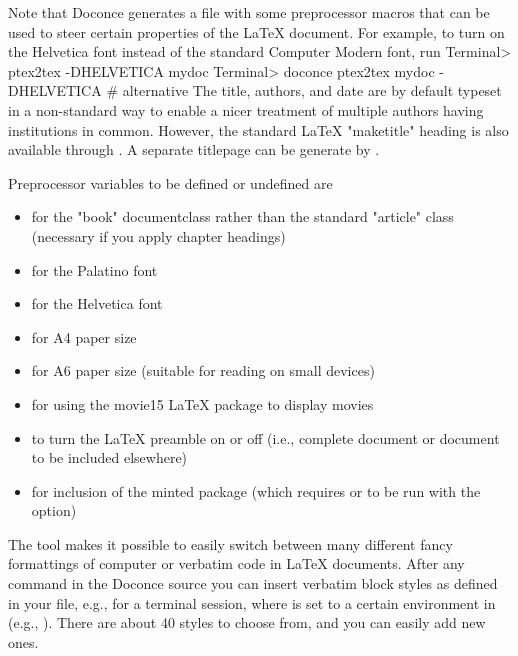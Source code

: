 \documentclass[%
oneside,                 %
final,                   %
chapterprefix=true,      %
open=right               %
10pt]{book}
\begin{document}
{{Note that Doconce generates a  file with some preprocessor macros
that can be used to steer certain properties of the {\LaTeX} document.
For example, to turn on the Helvetica font instead of the standard
Computer Modern font, run
\bsys
Terminal> ptex2tex -DHELVETICA mydoc
Terminal> doconce ptex2tex mydoc -DHELVETICA  # alternative
\esys
The title, authors, and date are by default typeset in a non-standard
way to enable a nicer treatment of multiple authors having
institutions in common. However, the standard {\LaTeX} "maketitle" heading
is also available through .
A separate titlepage can be generate by
.

Preprocessor variables to be defined or undefined are

\begin{itemize}
 \item {} for the "book" documentclass rather than the standard
   "article" class (necessary if you apply chapter headings)

 \item {} for the Palatino font

 \item {} for the Helvetica font

 \item {} for A4 paper size

 \item {} for A6 paper size (suitable for reading on small devices)

 \item {} for using the movie15 {\LaTeX} package to display movies

 \item {} to turn the {\LaTeX} preamble on or off (i.e., complete document
   or document to be included elsewhere)

 \item {} for inclusion of the minted package (which requires 
   or  to be run with the  option)
\end{itemize}

\noindent
The  tool makes it possible to easily switch between many
different fancy formattings of computer or verbatim code in {\LaTeX}
documents. After any  command in the Doconce source you can
insert verbatim block styles as defined in your 
file, e.g.,  for a terminal session, where  is set to
a certain environment in  (e.g., ).
There are about 40 styles to choose from, and you can easily add
new ones.

}}
\end{document}
